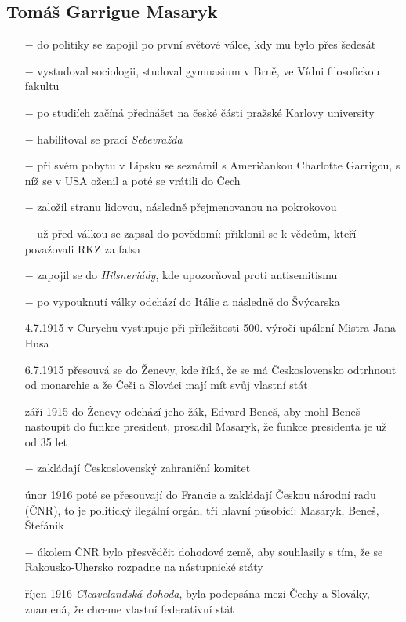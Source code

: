 \documentclass{article}
\begin{document}
\subsection*{Tomáš Garrigue Masaryk}
\begin{itemize}
    \vspace{-0.5em}
    \setlength\itemsep{0.15em}
    \item[$-$] do politiky se zapojil po první světové válce, kdy mu bylo přes šedesát
    \item[$-$] vystudoval sociologii, studoval gymnasium v Brně, ve Vídni filosofickou fakultu
    \item[$-$] po studiích začíná přednášet na české části pražské Karlovy university
    \item[$-$] habilitoval se prací \textit{Sebevražda}
    \item[$-$] při svém pobytu v Lipsku se seznámil s Američankou Charlotte Garrigou, s níž se v USA oženil a poté se vrátili do Čech
    \item[$-$] založil stranu lidovou, následně přejmenovanou na pokrokovou
    \item[$-$] už před válkou se zapsal do povědomí: přiklonil se k vědcům, kteří považovali RKZ za falsa
    \item[$-$] zapojil se do \textit{Hilsneriády}, kde upozorňoval proti antisemitismu
    \item[$-$] po vypouknutí války odchází do Itálie a následně do Švýcarska
    \item[4.7.1915] v Curychu vystupuje při příležitosti 500. výročí upálení Mistra Jana Husa
    \item[6.7.1915] přesouvá se do Ženevy, kde říká, že se má Československo odtrhnout od monarchie a že Češi a Slováci mají mít svůj vlastní stát
    \item[září 1915] do Ženevy odchází jeho žák, Edvard Beneš, aby mohl Beneš nastoupit do funkce president, prosadil Masaryk, že funkce presidenta je už od 35 let
    \item[$-$] zakládají Československý zahraniční komitet
    \item[únor 1916] poté se přesouvají do Francie a zakládají Českou národní radu (ČNR), to je politický ilegální orgán, tři hlavní působící: Masaryk, Beneš, Štefánik
    \item[$-$] úkolem ČNR bylo přesvědčit dohodové země, aby souhlasily s tím, že se Rakousko-Uhersko rozpadne na nástupnické státy
    \item[říjen 1916] \textit{Cleavelandská dohoda}, byla podepsána mezi Čechy a Slováky, znamená, že chceme vlastní federativní stát
\end{itemize}
\end{document}
